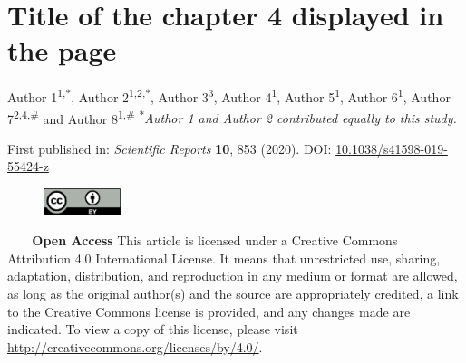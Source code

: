 \chapter[Title of the chapter 4 displayed in the table of contents]
    {Title of the chapter 4 displayed in the page
    }
\label{ch:labelchapter4}

\updatemylof %

\regularsection
\headerregularsection

Author 1\textsuperscript{1,\textcolor{sophia}{$\ast$}}, Author 2\textsuperscript{1,2,\textcolor{sophia}{$\ast$}}, Author 3\textsuperscript{3}, Author 4\textsuperscript{1}, Author 5\textsuperscript{1}, Author 6\textsuperscript{1}, Author 7\textsuperscript{2,4,\#} and Author 8\textsuperscript{1,\#} \hfill \textcolor{sophia}{\textsuperscript{$\ast$}\textit{Author 1 and Author 2 contributed equally to this study.}} \newline

\let\thefootnote\relax{}

\noindent First published in: \textit{Scientific Reports} \textbf{10}, 853 (2020). \hfill \break
DOI: \href{https://doi.org/10.1038/s41598-019-55424-z}{10.1038/s41598-019-55424-z} 

\begin{figure}
    \includegraphics[width=0.2\textwidth]{figures/by.png}
\end{figure} 

\noindent \textcolor{white}{test} \newline \textbf{Open Access} This article is licensed under a Creative Commons Attribution 4.0 International License. It means that unrestricted use, sharing, adaptation, distribution, and reproduction in any medium or format are allowed, as long as the original author(s) and the source are appropriately credited, a link to the Creative Commons license is provided, and any changes made are indicated. To view a copy of this license, please visit \href{http://creativecommons.org/licenses/by/4.0/}{http://creativecommons.org/licenses/by/4.0/}. \newline

